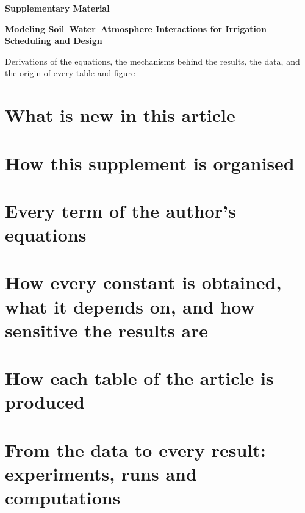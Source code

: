 
\renewcommand{\thesection}{S\arabic{section}}
\renewcommand{\theequation}{S\arabic{equation}}
\renewcommand{\thetable}{S\arabic{table}}
\renewcommand{\thefigure}{S\arabic{figure}}


\begin{center}{\large\bfseries Supplementary Material\par}\vspace{4pt}
{\Large\bfseries Modeling Soil--Water--Atmosphere Interactions for Irrigation Scheduling and Design\par}\vspace{6pt}
{\normalsize Derivations of the equations, the mechanisms behind the results, the data, and the origin of every table and figure\par}\end{center}
\authorblock
\tableofcontents
\clearpage
\section{What is new in this article}


\section{How this supplement is organised}




\section{Every term of the author's equations}


\section{How every constant is obtained, what it depends on, and how sensitive the results are}


\section{How each table of the article is produced}


\section{From the data to every result: experiments, runs and computations}\label{sec:prov}


